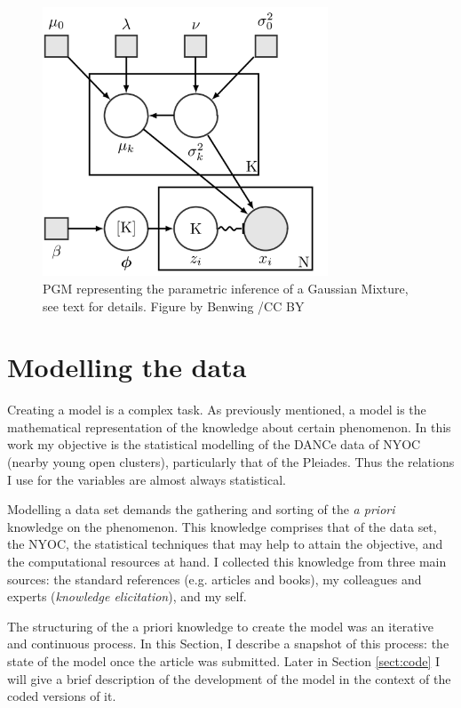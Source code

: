 \begin{figure}[ht!]
\begin{center}
\includegraphics[height=8cm]{background/Figures/BGMM.png}
\caption{PGM representing the parametric inference of a Gaussian Mixture, see text for details. Figure by Benwing /CC BY}
\label{fig:pgmGMM}
\end{center}
\end{figure}

\section{Modelling the data}
\label{sect:datamodelling}
Creating a model is a complex task. As previously mentioned, a model is the mathematical representation of the knowledge about certain phenomenon. In this work my objective is the statistical modelling of the DANCe data of NYOC (nearby young open clusters), particularly that of the Pleiades. Thus the relations I use for the variables are almost always statistical.

Modelling a data set demands the gathering and sorting of the \emph{a priori} knowledge on the phenomenon. This knowledge comprises that of the data set, the NYOC, the statistical techniques that may help to attain the objective, and the computational resources at hand. I collected this knowledge from three main sources: the standard references (e.g. articles and books), my colleagues and experts (\emph{knowledge elicitation}), and my self.

The structuring of the a priori knowledge to create the model was an iterative and continuous process.  In this Section, I describe a snapshot of this process: the state of the model once the article \citet{Olivares2017} was submitted. Later in Section \ref{sect:code} I will give a brief description of the development of the model in the context of the coded versions of it.

